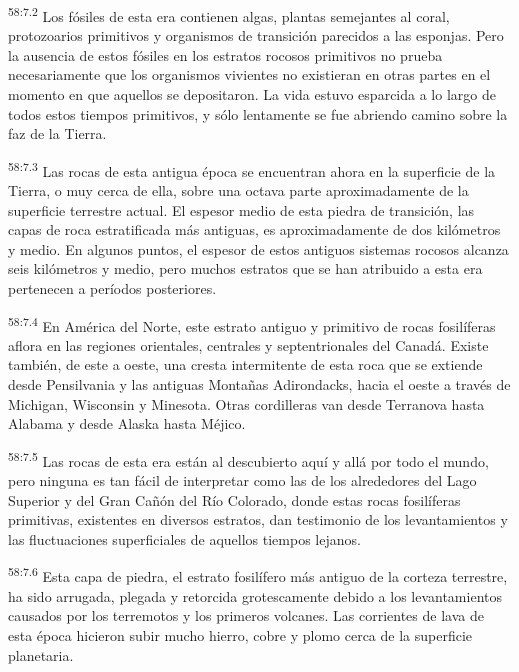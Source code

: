\par
\textsuperscript{58:7.2} Los fósiles de esta era contienen algas, plantas semejantes al coral, protozoarios primitivos y organismos de transición parecidos a las esponjas. Pero la ausencia de estos fósiles en los estratos rocosos primitivos no prueba necesariamente que los organismos vivientes no existieran en otras partes en el momento en que aquellos se depositaron. La vida estuvo esparcida a lo largo de todos estos tiempos primitivos, y sólo lentamente se fue abriendo camino sobre la faz de la Tierra.

\par
\textsuperscript{58:7.3} Las rocas de esta antigua época se encuentran ahora en la superficie de la Tierra, o muy cerca de ella, sobre una octava parte aproximadamente de la superficie terrestre actual. El espesor medio de esta piedra de transición, las capas de roca estratificada más antiguas, es aproximadamente de dos kilómetros y medio. En algunos puntos, el espesor de estos antiguos sistemas rocosos alcanza seis kilómetros y medio, pero muchos estratos que se han atribuido a esta era pertenecen a períodos posteriores.

\par
\textsuperscript{58:7.4} En América del Norte, este estrato antiguo y primitivo de rocas fosilíferas aflora en las regiones orientales, centrales y septentrionales del Canadá. Existe también, de este a oeste, una cresta intermitente de esta roca que se extiende desde Pensilvania y las antiguas Montañas Adirondacks, hacia el oeste a través de Michigan, Wisconsin y Minesota. Otras cordilleras van desde Terranova hasta Alabama y desde Alaska hasta Méjico.

\par
\textsuperscript{58:7.5} Las rocas de esta era están al descubierto aquí y allá por todo el mundo, pero ninguna es tan fácil de interpretar como las de los alrededores del Lago Superior y del Gran Cañón del Río Colorado, donde estas rocas fosilíferas primitivas, existentes en diversos estratos, dan testimonio de los levantamientos y las fluctuaciones superficiales de aquellos tiempos lejanos.

\par
\textsuperscript{58:7.6} Esta capa de piedra, el estrato fosilífero más antiguo de la corteza terrestre, ha sido arrugada, plegada y retorcida grotescamente debido a los levantamientos causados por los terremotos y los primeros volcanes. Las corrientes de lava de esta época hicieron subir mucho hierro, cobre y plomo cerca de la superficie planetaria.

